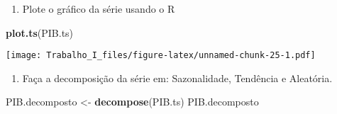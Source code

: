 \documentclass[]{article}
\newenvironment{Shaded}{\begin{snugshade}}{\end{snugshade}}
\newcommand{\KeywordTok}[1]{\textcolor[rgb]{0.13,0.29,0.53}{\textbf{#1}}}
\newcommand{\StringTok}[1]{\textcolor[rgb]{0.31,0.60,0.02}{#1}}
\newcommand{\NormalTok}[1]{#1}
\providecommand{\tightlist}{%
  \setlength{\itemsep}{0pt}\setlength{\parskip}{0pt}}
\begin{document}
\begin{enumerate}
\def\labelenumi{\alph{enumi})}
\tightlist
\item
  Plote o gráfico da série usando o R
\end{enumerate}

\begin{Shaded}
\begin{Highlighting}[]
\KeywordTok{plot.ts}\NormalTok{(PIB.ts)}
\end{Highlighting}
\end{Shaded}

\texttt{[image: Trabalho\_I\_files/figure-latex/unnamed-chunk-25-1.pdf]}

\begin{enumerate}
\def\labelenumi{\alph{enumi})}
\setcounter{enumi}{1}
\tightlist
\item
  Faça a decomposição da série em: Sazonalidade, Tendência e Aleatória.
\end{enumerate}

\begin{Shaded}
\begin{Highlighting}[]
\NormalTok{PIB.decomposto <-}\StringTok{ }\KeywordTok{decompose}\NormalTok{(PIB.ts)}
\NormalTok{PIB.decomposto}
\end{Highlighting}
\end{Shaded}
\end{document}

